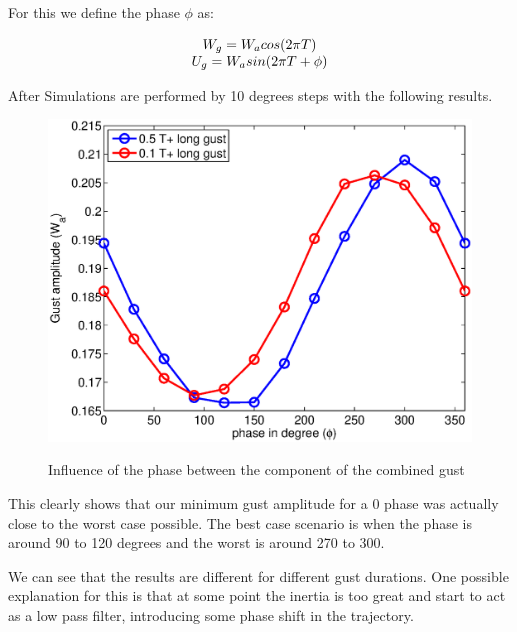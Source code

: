 \par For this we define the phase $\phi$ as:

\begin{equation}
  \begin{array}[c]{c}
    W_g=W_a cos(2\pi T) \\
    U_g=W_a sin(2\pi T + \phi)
  \end{array}
  \label{eqn:combined_gust_phase}
\end{equation}

After Simulations are performed by 10 degrees steps with the following results.

\begin{figure}[ht]
  \begin{center}
    \scalebox{0.8}
    {\includegraphics{./Figures/combined_gust_amplitude_vs_phase.eps}}
  \end{center}
  \caption{Influence of the phase between the component of the combined gust}
  \label{fig:combined_amplitude_phase}
\end{figure}

\par This clearly shows that our minimum gust amplitude for a 0 phase was actually close to the worst case possible.
The best case scenario is when the phase is around 90 to 120 degrees and the worst is around 270 to 300.

\FloatBarrier

\par We can see that the results are different for different gust durations.
One possible explanation for this is that at some point the inertia is too great and start to act as a low pass filter, introducing some phase shift in the trajectory. 



